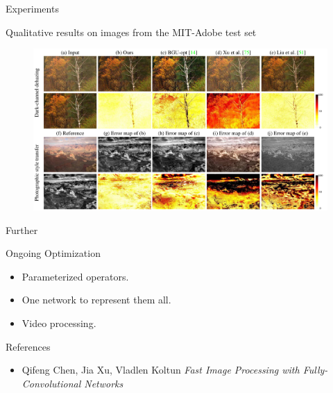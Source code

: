 \documentclass[notes]{beamer}
\begin{document}
\begin{frame}{Experiments}
	\begin{block}{Qualitative results on images from the MIT-Adobe test set}
		\begin{figure}
			\includegraphics[width=1.0\textwidth]{2.png}
		\end{figure}
	\end{block}
\end{frame}



\begin{frame}{Further}
	\begin{block}{Ongoing Optimization}
		\begin{itemize}
			\item Parameterized operators. 
			\item One network to represent them all. 
			\item Video processing. 
		\end{itemize}
	\end{block}
\end{frame}


\begin{frame}{References}
	\begin{itemize}
		\item Qifeng Chen, Jia Xu, Vladlen Koltun \textit{Fast Image Processing with Fully-Convolutional Networks}
	
	\end{itemize}
\end{frame}
\end{document}
